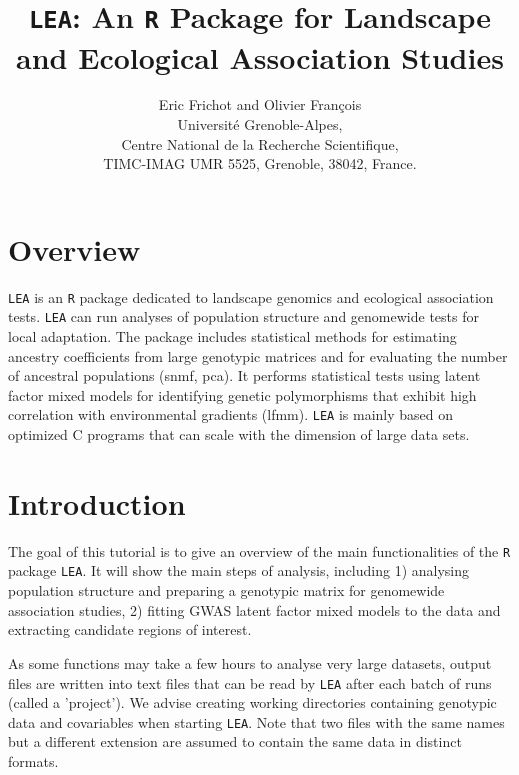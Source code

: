 \documentclass[12pt,a4paper,oneside]{article}\usepackage[]{graphicx}\usepackage[]{color}
\begin{document}
\title{{\tt LEA}: An {\tt R} Package for Landscape and Ecological Association Studies}
\author{Eric Frichot and Olivier Fran\c{c}ois \\ 
Universit\'e Grenoble-Alpes,\\ Centre National de la Recherche Scientifique, \\
TIMC-IMAG UMR 5525, Grenoble, 38042, France.
}
\date{}
\maketitle
\tableofcontents

\section{Overview}
{\tt LEA} \citep{Frichot_2015} is an {\tt R} package dedicated to landscape genomics and
    ecological association tests. {\tt LEA} can run analyses of
        population structure and genomewide tests for local adaptation. 
        The package includes statistical methods for estimating ancestry
        coefficients from large genotypic matrices and for evaluating the
        number of ancestral populations (snmf, pca). It performs statistical 
        tests using latent factor mixed models for identifying
        genetic polymorphisms that exhibit high correlation with
        environmental gradients (lfmm). {\tt LEA} is mainly based on optimized C programs
        that can scale with the dimension of large data sets.  


\section{Introduction} 
The goal of this tutorial is to give an overview of the main  functionalities of the {\tt R} package {\tt LEA}. It will show the main steps of analysis, including 1) analysing population structure and preparing a genotypic matrix for genomewide association studies, 2) fitting GWAS latent factor mixed models to the data and extracting candidate regions of interest.    

As some functions may take a few hours to analyse very large datasets, output files are written into text files that can be read by {\tt LEA} after each batch of runs (called a 'project'). We advise creating working directories containing genotypic data and covariables when starting {\tt LEA}. Note that two files with the same names but a different extension are assumed to contain the same data in distinct formats.
\end{document}
